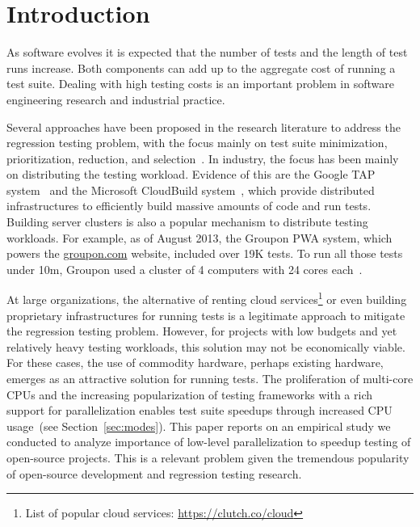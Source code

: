 \section{Introduction}


As software evolves it is expected that the number of tests and the
length of test runs increase.  Both components can add up to the
aggregate cost of running a test suite.  Dealing with high testing
costs is an important problem in software engineering research and
industrial practice.

Several approaches have been proposed in the research literature to
address the regression testing problem, with the focus mainly on test
suite minimization, prioritization, reduction, and
selection~\cite{yoo-harman-stvr2012}.  In industry, the focus has been
mainly on distributing the testing workload.  Evidence of this are the
Google TAP system~\cite{google-tap,google-ci} and the Microsoft
CloudBuild system~\cite{prasad-shulte-ieee-microsoft-ci}, which
provide distributed infrastructures to efficiently build massive
amounts of code and run tests.  Building server clusters is also a
popular mechanism to distribute testing workloads.  For example, as of
August 2013, the Groupon PWA system, which powers the
\url{groupon.com} website, included over 19K tests.  To run all those
tests under 10m, Groupon used a cluster of 4 computers with 24 cores
each~\cite{kim-etal-fse2013}.

At large organizations, the alternative of renting cloud
services\footnote{List of popular cloud services:
  \url{https://clutch.co/cloud}} or even building proprietary
infrastructures for running tests is a legitimate approach to mitigate
the regression testing problem.  However, for projects with low
budgets and yet relatively heavy testing workloads, this solution may
not be economically viable.  For these cases, the use of commodity
hardware, perhaps existing hardware, emerges as an attractive solution
for running tests.  The proliferation of multi-core CPUs and the
increasing popularization of testing frameworks with a rich support
for parallelization enables test suite speedups through increased CPU
usage~(see Section~\ref{sec:modes}).  This paper reports on an
empirical study we conducted to analyze importance of low-level
parallelization to speedup testing of open-source projects.  This is a
relevant problem given the tremendous popularity of open-source
development and regression testing research.

